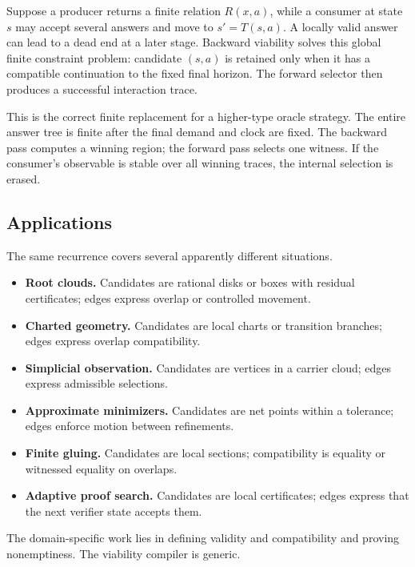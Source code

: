 Suppose a producer returns a finite relation \(R(x,a)\), while a consumer at state
\(s\) may accept several answers and move to \(s'=T(s,a)\).  A locally valid answer
can lead to a dead end at a later stage.  Backward viability solves this global finite
constraint problem: candidate \((s,a)\) is retained only when it has a compatible
continuation to the fixed final horizon.  The forward selector then produces a
successful interaction trace.

This is the correct finite replacement for a higher-type oracle strategy.  The entire
answer tree is finite after the final demand and clock are fixed.  The backward pass
computes a winning region; the forward pass selects one witness.  If the consumer's
observable is stable over all winning traces, the internal selection is erased.

\subsection{Applications}

The same recurrence covers several apparently different situations.

\begin{itemize}
\item \textbf{Root clouds.}  Candidates are rational disks or boxes with residual
certificates; edges express overlap or controlled movement.
\item \textbf{Charted geometry.}  Candidates are local charts or transition branches;
edges express overlap compatibility.
\item \textbf{Simplicial observation.}  Candidates are vertices in a carrier cloud;
edges express admissible selections.
\item \textbf{Approximate minimizers.}  Candidates are net points within a tolerance;
edges enforce motion between refinements.
\item \textbf{Finite gluing.}  Candidates are local sections; compatibility is equality
or witnessed equality on overlaps.
\item \textbf{Adaptive proof search.}  Candidates are local certificates; edges express
that the next verifier state accepts them.
\end{itemize}

The domain-specific work lies in defining validity and compatibility and proving
nonemptiness.  The viability compiler is generic.
